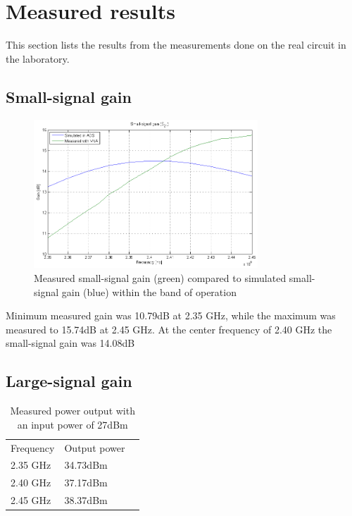   \section{Measured results}
  This section lists the results from the measurements done on the real circuit in the laboratory.

  \subsection{Small-signal gain}

  \begin{figure}[H]
	  \centering
	  \includegraphics[width=0.75\textwidth]{img/S21_meas_sim}
	  \caption{Measured small-signal gain (green) compared to simulated small-signal gain (blue) within the band of operation}
	  \label{fig:Meas_S21}
  \end{figure}

Minimum measured gain was 10.79dB at 2.35 GHz, while the maximum was measured to 15.74dB at 2.45 GHz. At the center frequency of 2.40 GHz the small-signal gain was 14.08dB

  \subsection{Large-signal gain}


  \begin{table}[H]
	  \centering
	  \begin{tabular}{l l l}
		  Frequency & Output power\\
		  2.35 GHz & 34.73dBm \\
		  2.40 GHz & 37.17dBm \\
		  2.45 GHz & 38.37dBm
	  \end{tabular}
	  \caption{Measured power output with an input power of 27dBm}
	  \label{tab:Meas_Pout}
  \end{table}

